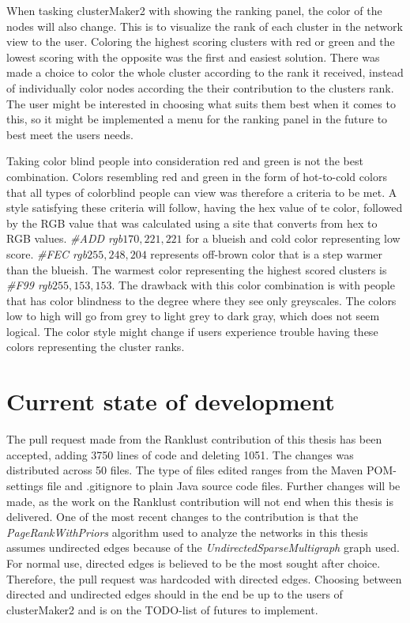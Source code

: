 When tasking clusterMaker2 with showing the ranking panel, the color of the
nodes will also change. This is to visualize the rank of each cluster in the
network view to the user. Coloring the highest scoring clusters with red or
green and the lowest scoring with the opposite was the first and easiest
solution. There was made a choice to color the whole cluster according to the
rank it received, instead of individually color nodes according the their
contribution to the clusters rank. The user might be interested in choosing what
suits them best when it comes to this, so it might be implemented a menu for the
ranking panel in the future to best meet the users needs.

Taking color blind people into consideration red and green is not the
best combination. Colors resembling red and green in the form of hot-to-cold
colors that all types of colorblind people can view was therefore a criteria to
be met. A style satisfying these criteria will follow, having the hex value of
te color\cite{color-blindness3}, followed by the RGB value that was calculated
using a site that converts from hex to RGB values\cite{color-blindness2}.
\textit{\#ADD rgb\(170,221,221\)} for a blueish and cold color representing low
score. \textit{\#FEC rgb\(255,248,204\)} represents off-brown color that is a
step warmer than the blueish. The warmest color representing the highest scored
clusters is \textit{\#F99 rgb\(255,153,153\)}. The drawback with this color
combination is with people that has color blindness to the degree where they see
only greyscales. The colors low to high will go from grey to light grey to dark
gray, which does not seem logical. The color style might change if users
experience trouble having these colors representing the cluster ranks. 

\section{Current state of development}
The pull request\cite{git-pull-request} made from the Ranklust
contribution of this thesis has been accepted\cite{ranklust-accepted}, adding
3750 lines of code and deleting 1051. The changes was distributed across 50
files. The type of files edited ranges from the Maven POM-settings file and
.gitignore to plain Java source code files. Further changes will be made, as the
work on the Ranklust contribution will not end when this thesis is delivered.
One of the most recent changes to the contribution is that the
\textit{PageRankWithPriors} algorithm used to analyze the networks in this
thesis assumes undirected edges because of the
\textit{UndirectedSparseMultigraph} graph used. For normal use, directed edges
is believed to be the most sought after choice. Therefore, the pull request was
hardcoded with directed edges. Choosing between directed and undirected edges
should in the end be up to the users of clusterMaker2 and is on the TODO-list of
futures to implement.


